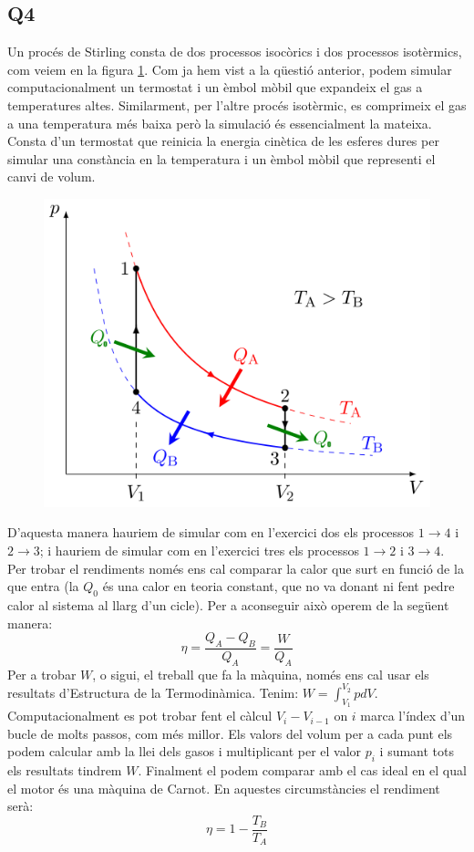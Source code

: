 \documentclass{article}
\begin{document}
	
	
	\subsection*{Q4}
	Un procés de Stirling consta de dos processos isocòrics i dos processos isotèrmics, com veiem en la figura \ref{gurururur}.
	Com ja hem vist a la qüestió anterior, podem simular computacionalment un termostat i un èmbol mòbil que expandeix el gas a temperatures altes. Similarment, per l'altre procés isotèrmic, es comprimeix el gas a una temperatura més baixa però la simulació és essencialment la mateixa. Consta d'un termostat que reinicia la energia cinètica de les esferes dures per simular una constància en la temperatura i un èmbol mòbil que representi el canvi de volum.\\
	\begin{figure}[h!]
		\centering
		\includegraphics[width=0.5\linewidth]{Ciclo_de_Stirling_pV.png}
		\caption{}
		\label{gurururur}
	\end{figure}	
	
	

	
	\par D'aquesta manera hauriem de simular com en l'exercici dos els processos $1\to 4$ i $2 \to 3$; i hauriem de simular com en l'exercici tres els processos $1\to2$ i $3\to4$. Per trobar el rendiments només ens cal comparar la calor que surt en funció de la que entra (la $Q_0$ és una calor en teoria constant, que no va donant ni fent pedre calor al sistema al llarg d'un cicle). Per a aconseguir això operem de la següent manera: 
	$$
	\eta =\frac{Q_A - Q_B}{Q_A}=\frac{W}{Q_A}
	$$
	Per a trobar $W$, o sigui, el treball que fa la màquina, només ens cal usar els resultats d'Estructura de la Termodinàmica.  Tenim: $W = \int_{V_1}^{V_2} pdV$. Computacionalment es pot trobar fent el càlcul $V_{i}-V_{i-1}$ on $i$ marca l'índex d'un bucle de molts passos, com més millor. Els valors del volum per a cada punt els podem calcular amb la llei dels gasos i multiplicant per el valor $p_{i}$ i sumant tots els resultats tindrem $W$. Finalment el podem comparar amb el cas ideal en el qual el motor és una màquina de Carnot. En aquestes circumstàncies el rendiment serà: 
	$$
	\eta = 1- \frac{T_B}{T_A}
	$$ 
\end{document}
